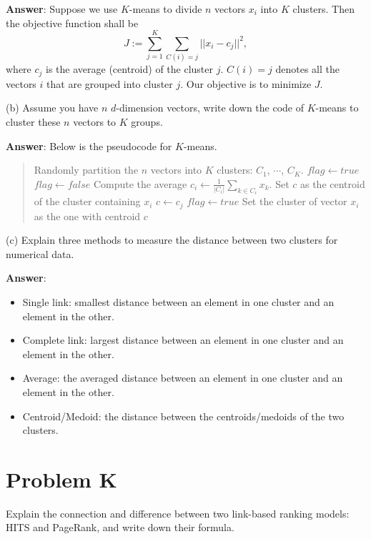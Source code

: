 \documentclass{article}
\begin{document}
{\bf Answer}:
Suppose we use $K$-means to divide $n$ vectors $x_i$ into $K$ clusters. Then the objective function shall be
$$J := \sum_{j=1} ^K \sum_{C(i) = j} ||x_i - c_j||^2,$$
where $c_j$ is the average (centroid) of the cluster $j$. $C(i) = j$ denotes all the vectors $i$ that are grouped into cluster $j$. Our objective is to minimize $J$.

(b) Assume you have $n$ $d$-dimension vectors, write down the code of $K$-means to cluster these $n$ vectors to $K$ groups.

{\bf Answer}: Below is the pseudocode for $K$-means.
\begin{quote}
\centering
\begin{algorithmic}
\State Randomly partition the $n$ vectors into $K$ clusters: $C_1$, $\cdots$, $C_K$.
\State $flag \gets true$
  \State $flag \gets false$
    \State Compute the average $c_i \gets \frac{1}{|C_i|}\sum_{k\in C_i} x_k$.
  \EndFor
    \State Set $c$ as the centroid of the cluster containing $x_i$
        \State $c \gets c_j$
        \State $flag \gets true$
      \EndIf
    \EndFor
    \State  Set the cluster of vector $x_i$ as the one with centroid $c$
  \EndFor
\EndWhile
\end{algorithmic}
\end{quote}

(c) Explain three methods to measure the distance between two clusters for numerical data.

{\bf Answer}:
\begin{itemize}
\item Single link: smallest distance between an element in one cluster and an element in the other.
\item Complete link: largest distance between an element in one cluster and an element in the other.
\item Average: the averaged distance between an element in one cluster and an element in the other.
\item Centroid/Medoid: the distance between the centroids/medoids of the two clusters.
\end{itemize}

\section{Problem K}
Explain the connection and difference between two link-based ranking models: HITS and PageRank, and write down their formula.
\end{document}
